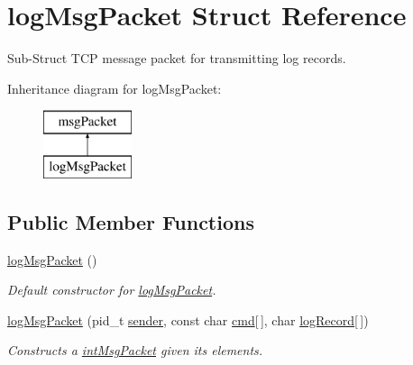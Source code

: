 \hypertarget{structlogMsgPacket}{\section{log\-Msg\-Packet Struct Reference}
\label{structlogMsgPacket}
}


Sub-\/\-Struct T\-C\-P message packet for transmitting log records.  


Inheritance diagram for log\-Msg\-Packet\-:\begin{figure}[H]
\begin{center}
\leavevmode
\includegraphics[height=2.000000cm]{structlogMsgPacket}
\end{center}
\end{figure}
\subsection*{Public Member Functions}
\begin{DoxyCompactItemize}
\item 
\hypertarget{structlogMsgPacket_ac6231231cfcd4000902c5bdb3165432c}{\hyperlink{structlogMsgPacket_ac6231231cfcd4000902c5bdb3165432c}{log\-Msg\-Packet} ()}\label{structlogMsgPacket_ac6231231cfcd4000902c5bdb3165432c}

\begin{DoxyCompactList}\small\item\em Default constructor for \hyperlink{structlogMsgPacket}{log\-Msg\-Packet}. \end{DoxyCompactList}\item 
\hyperlink{structlogMsgPacket_ab56f75cef643f8d69b59a007b3e61fa4}{log\-Msg\-Packet} (pid\-\_\-t \hyperlink{structmsgPacket_a294c1f456116eb9177b31ab8b5577f86}{sender}, const char \hyperlink{structmsgPacket_a8b49c124b4ca2ed872692333b71d74fd}{cmd}\mbox{[}$\,$\mbox{]}, char \hyperlink{structlogMsgPacket_a3080c749154c1b7e0f885d5a0bc5859b}{log\-Record}\mbox{[}$\,$\mbox{]})
\begin{DoxyCompactList}\small\item\em Constructs a \hyperlink{structintMsgPacket}{int\-Msg\-Packet} given its elements. \end{DoxyCompactList}\end{DoxyCompactItemize}
